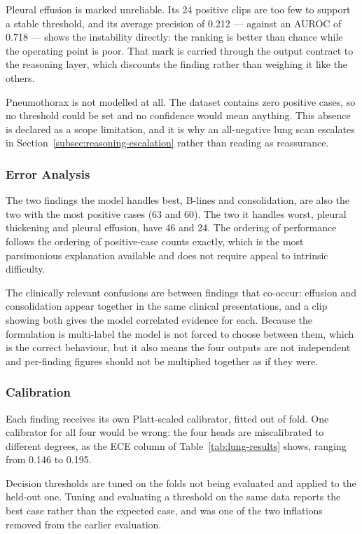 Pleural effusion is marked unreliable. Its 24 positive clips are too few to support a stable
threshold, and its average precision of 0.212 --- against an AUROC of 0.718 --- shows the
instability directly: the ranking is better than chance while the operating point is poor. That
mark is carried through the output contract to the reasoning layer, which discounts the finding
rather than weighing it like the others.

Pneumothorax is not modelled at all. The dataset contains zero positive cases, so no threshold
could be set and no confidence would mean anything. This absence is declared as a scope
limitation, and it is why an all-negative lung scan escalates in
Section~\ref{subsec:reasoning-escalation} rather than reading as reassurance.

\subsubsection{Error Analysis}

The two findings the model handles best, B-lines and consolidation, are also the two with the
most positive cases (63 and 60). The two it handles worst, pleural thickening and pleural
effusion, have 46 and 24. The ordering of performance follows the ordering of positive-case
counts exactly, which is the most parsimonious explanation available and does not require
appeal to intrinsic difficulty.

The clinically relevant confusions are between findings that co-occur: effusion and
consolidation appear together in the same clinical presentations, and a clip showing both gives
the model correlated evidence for each. Because the formulation is multi-label the model is not
forced to choose between them, which is the correct behaviour, but it also means the four
outputs are not independent and per-finding figures should not be multiplied together as if
they were.

\subsubsection{Calibration}
\label{subsubsec:lung-calibration}

Each finding receives its own Platt-scaled calibrator, fitted out of fold. One calibrator for
all four would be wrong: the four heads are miscalibrated to different degrees, as the ECE
column of Table~\ref{tab:lung-results} shows, ranging from 0.146 to 0.195.

Decision thresholds are tuned on the folds not being evaluated and applied to the held-out one.
Tuning and evaluating a threshold on the same data reports the best case rather than the
expected case, and was one of the two inflations removed from the earlier evaluation.

